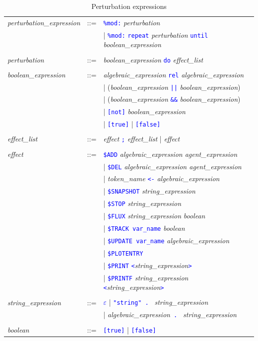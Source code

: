 \documentclass[11pt]{book}
\def\tcb#1{\textcolor{blue}{\ttt{#1}}}
\def\ttt#1{\texttt{#1}}
\def\var#1{{\textquotesingle}#1{\textquotesingle}}
\begin{document}
\begin{table}[htbp]
  \centering
  \caption{Perturbation expressions}
  \begin{tabular}{@{} lcl @{}}
  	\textit{perturbation\_expression} &::=& \tcb{\ttt{\%mod:}} \textit{perturbation} \\
	&& | \tcb{\ttt{\%mod:}} \tcb{\ttt{repeat}} \textit{perturbation} \tcb{\ttt{until}} \textit{boolean\_expression} \\\\ 
    
    \textit{perturbation} &::=& \textit{boolean\_expression} \tcb{\ttt{do}} \textit{effect\_list} \\\\
    \textit{boolean\_expression} &::=& \textit{algebraic\_expression}\index{boolean expression} \tcb{rel} \textit{algebraic\_expression} \\
    && | (\textit{boolean\_expression} \tcb{||} \textit{boolean\_expression}) \\
    && | (\textit{boolean\_expression} \tcb{\&\&} \textit{boolean\_expression}) \\
    && | \tcb{[not]} \textit{boolean\_expression} \\
    && | \tcb{[true]} | \tcb{[false]} \\\\
    \textit{effect\_list} &::=& \textit{effect} \tcb{\ttt {;}} \textit{effect\_list} | \textit{effect} \\\\
\textit{effect} &::=& \tcb{\$ADD} \textit{algebraic\_expression agent\_expression} \\
    && | \tcb{\$DEL} \textit{algebraic\_expression agent\_expression} \\
    && | \textit{token\_name} \tcb{<-} \textit{algebraic\_expression} \\
    && | \tcb{\$SNAPSHOT} \textit{string\_expression}\\
    && | \tcb{\$STOP} \textit{string\_expression}\\
	&& | \tcb{\$FLUX} \textit{string\_expression} \textit{boolean} \\
    && | \tcb{\$TRACK \var{var\_name}} \textit{boolean} \\
    && | \tcb{\$UPDATE \var{var\_name}} \textit{algebraic\_expression} \\
    && | \tcb{\$PLOTENTRY} \\
    && | \tcb{\$PRINT} \tcb{<}\textit{string\_expression}\tcb{>} \\
    && | \tcb{\$PRINTF} \textit{string\_expression} \tcb{<}\textit{string\_expression}\tcb{>} \\
    \\
    \textit{string\_expression} &::=& \tcb{$\varepsilon$} | \tcb{"string" . } \textit{string\_expression} \\
    && | \textit{algebraic\_expression}\tcb{ . } \textit{string\_expression} \\\\
	\textit{boolean} &::=& \tcb{[true]} | \tcb{[false]}
  \end{tabular}
  \label{tab:pert}
\end{table}
\end{document}
